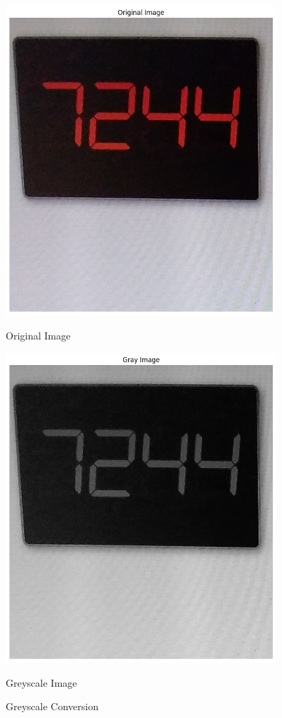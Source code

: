 \begin{figure}[h]
    \centering
    \begin{minipage}{0.45\textwidth}
        \centering
        \includegraphics[width=0.9\textwidth]{Figures/gray/original.png}
        \caption*{Original Image}
    \end{minipage}\hfill
    \begin{minipage}{0.45\textwidth}
        \centering
        \includegraphics[width=0.9\textwidth]{Figures/gray/grey.png}
        \caption*{Greyscale Image}
    \end{minipage}
    \caption{Greyscale Conversion}
\end{figure}

